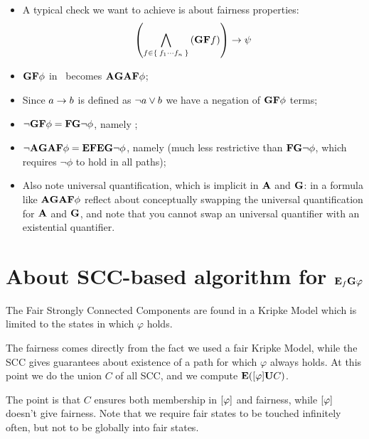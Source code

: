 \documentclass[a3paper]{article}
\begin{document}
            \begin{itemize}

            \item   A typical check we want to achieve is about fairness
                    properties:
                    \[
                    \left(
                        \bigwedge_{f \in \Set{ f_1 \cdots f_n }}^{}\left({\mathcal{\sf \bf G}\mathcal{\sf \bf F}f}\right)
                    \right)
                    \rightarrow \psi
                    \]

            \item   $\mathcal{\sf \bf G}\mathcal{\sf \bf F}\phi$ in \CTL\ becomes $\mathcal{\mathcal{\sf \bf A}}{\mathcal{\sf \bf G}\mathcal{\mathcal{\sf \bf A}}{\mathcal{\sf \bf F}\phi}}$;

            \item   Since $a \rightarrow b$ is defined as $\neg a \vee b$ we
                    have a negation of $\mathcal{\sf \bf G}\mathcal{\sf \bf F}\phi$ terms;

            \item   $\neg \mathcal{\sf \bf G}\mathcal{\sf \bf F}\phi = \mathcal{\sf \bf F}\mathcal{\sf \bf G}\neg \phi$, namely
                    ;

            \item   $\neg \mathcal{\mathcal{\sf \bf A}}{\mathcal{\sf \bf G}\mathcal{\mathcal{\sf \bf A}}{\mathcal{\sf \bf F}\phi}} = \mathcal{\mathcal{\sf \bf E}}{\mathcal{\sf \bf F}\mathcal{\mathcal{\sf \bf E}}{\mathcal{\sf \bf G}\neg \phi}}$, namely
                     (much less restrictive than $\mathcal{\sf \bf F}\mathcal{\sf \bf G}\neg
                    \phi$, which requires $\neg \phi$ to hold in all
                    paths);

            \item   Also note universal quantification, which is implicit
                    in $\mathcal{\mathcal{\sf \bf A}}{}$ and $\mathcal{\sf \bf G}$: in a formula like
                    $\mathcal{\mathcal{\sf \bf A}}{\mathcal{\sf \bf G}\mathcal{\mathcal{\sf \bf A}}{\mathcal{\sf \bf F}\phi}}$ reflect about conceptually swapping
                    the universal quantification for $\mathcal{\mathcal{\sf \bf A}}{}$ and $\mathcal{\sf \bf G}$,
                    and note that you cannot swap an universal quantifier
                    with an existential quantifier.

            \end{itemize}

    \section{About SCC-based algorithm for $\mathcal{\mathcal{\sf \bf E}}_{f}{\mathcal{\sf \bf G}\varphi}$}

        The Fair Strongly Connected Components are found in a Kripke Model
        which is limited to the states in which $\varphi$ holds.

        The fairness comes directly from the fact we used a fair Kripke
        Model, while the SCC gives guarantees about existence of a path
        for which $\varphi$ always holds. At this point we do the union
        $C$ of all SCC, and we compute $\mathcal{\mathcal{\sf \bf E}}{({\left[{\varphi}\right]}\mathcal{\sf \bf U}{C})}$.

        The point is that $C$ ensures both membership in $\left[{\varphi}\right]$
        and fairness, while $\left[{\varphi}\right]$ doesn't give fairness. Note
        that we require fair states to be touched infinitely often, but
        not to be globally into fair states.
\end{document}
